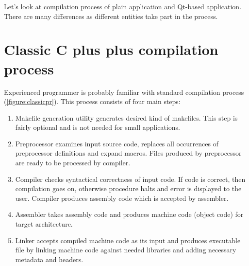 Let's look at compilation process of plain \cpp{} application and Qt-based application. There are many differences as different entities take part in the process.

\section{Classic C plus plus compilation process}
Experienced \cpp{} programmer is probably familiar with standard compilation process (\autoref{figure:classicpr}). This process consists of four main steps:
\begin{enumerate}
\item Makefile generation utility generates desired kind of makefiles. This step is fairly optional and is not needed for small applications.
\item Preprocessor examines input source code, replaces all occurrences of preprocessor definitions and expand macros. Files produced by preprocessor are ready to be processed by compiler.
\item Compiler checks syntactical correctness of input \cpp{} code. If code is correct, then compilation goes on, otherwise procedure halts and error is displayed to the user. Compiler produces assembly code which is accepted by assembler.
\item Assembler takes assembly code and produces machine code (object code) for target architecture.
\item Linker accepts compiled machine code as its input and produces executable file by linking machine code against needed libraries and adding necessary metadata and headers.
\end{enumerate}

